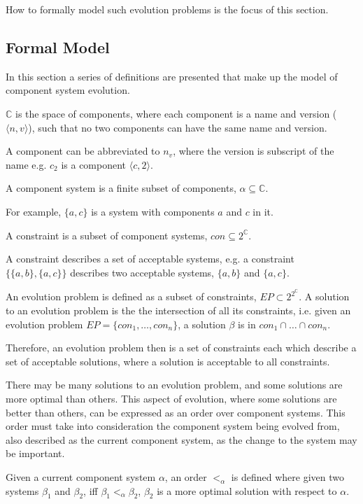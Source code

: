 How to formally model such evolution problems is the focus of this section.

\subsection{Formal Model}
In this section a series of definitions are presented that make up the model of component system evolution.

\begin{defs}
\label{formal.componentdef}
$\mathbb{C}$ is the space of components, where each component is a name and version ($\langle n, v\rangle$), such that no two components can have the same name and version.
\end{defs}
A component can be abbreviated to $n_v$, where the version is subscript of the name e.g. $c_2$ is a component $\langle c, 2\rangle$.

\begin{defs}
\label{formal.componentsystemdef}
A component system is a finite subset of components, $\alpha \subseteq \mathbb{C}$. 
\end{defs}
For example, $\{a,c\}$ is a system with components $a$ and $c$ in it.

\begin{defs}
\label{formal.constraintdefs}
A constraint is a subset of component systems, $con \subseteq 2^{\mathbb{C}}$.
\end{defs}
A constraint describes a set of acceptable systems, e.g. a constraint $\{\{a,b\},\{a,c\}\}$ describes two acceptable systems, $\{a,b\}$ and $\{a,c\}$.

\begin{defs}
An evolution problem is defined as a subset of constraints, $EP \subset 2^{2^{\mathbb{C}}}$.
A solution to an evolution problem is the the intersection of all its constraints, i.e. given an evolution problem $EP = \{con_1,\ldots,con_n\}$,
a solution $\beta$ is in $con_1 \cap \ldots \cap con_n$. 
\end{defs}
Therefore, an evolution problem then is a set of constraints each which describe a set of acceptable solutions, where a solution is acceptable to all constraints.

There may be many solutions to an evolution problem, and some solutions are more optimal than others.
This aspect of evolution, where some solutions are better than others, can be expressed as an order over component systems.
This order must take into consideration the component system being evolved from, also described as the current component system, as the change to the system may be important.
\begin{defs}
Given a current component system $\alpha$, an order $<_{\alpha}$ is defined where
given two systems $\beta_1$ and $\beta_2$, iff $\beta_1 <_{\alpha} \beta_2$, $\beta_2$ is a more optimal solution with respect to $\alpha$.
\end{defs}

